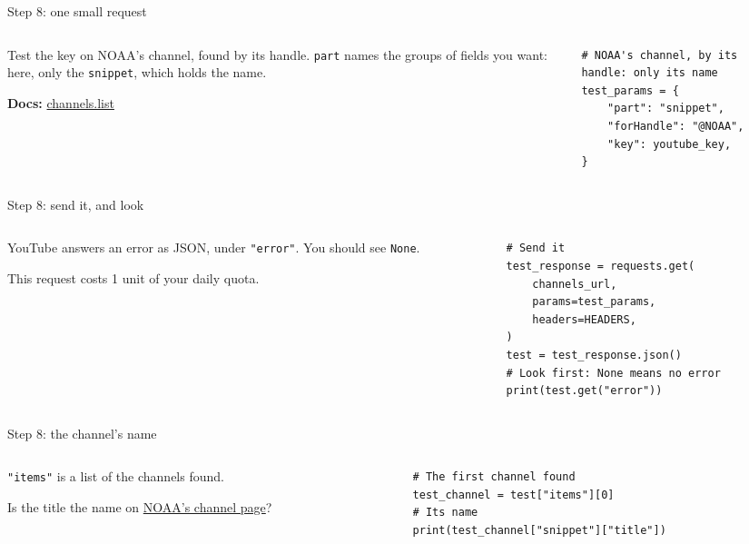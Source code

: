 \documentclass[9pt,aspectratio=169]{beamer}
\begin{document}
\begin{frame}[fragile]{Step 8: one small request}
    \begin{columns}[T]
        \begin{column}{0.37\textwidth}
            Test the key on NOAA's channel, found by its handle. \texttt{part} names the groups of fields you want: here, only the \texttt{snippet}, which holds the name.

            \medskip
            {\scriptsize\textbf{Docs:} \href{https://developers.google.com/youtube/data/reference/rest/v3/channels/list}{channels.list}\par}
        \end{column}
        \begin{column}{0.6\textwidth}
\begin{lstlisting}
# NOAA's channel, by its handle: only its name
test_params = {
    "part": "snippet",
    "forHandle": "@NOAA",
    "key": youtube_key,
}
\end{lstlisting}
        \end{column}
    \end{columns}
\end{frame}

\begin{frame}[fragile]{Step 8: send it, and look}
    \begin{columns}[T]
        \begin{column}{0.37\textwidth}
            YouTube answers an error as JSON, under \texttt{"error"}. You should see \texttt{None}.

            \medskip
            This request costs 1 unit of your daily quota.
        \end{column}
        \begin{column}{0.6\textwidth}
\begin{lstlisting}
# Send it
test_response = requests.get(
    channels_url,
    params=test_params,
    headers=HEADERS,
)
test = test_response.json()
# Look first: None means no error
print(test.get("error"))
\end{lstlisting}
        \end{column}
    \end{columns}
\end{frame}

\begin{frame}[fragile]{Step 8: the channel's name}
    \begin{columns}[T]
        \begin{column}{0.37\textwidth}
            \texttt{"items"} is a list of the channels found.

            \medskip
            Is the title the name on \href{https://www.youtube.com/@NOAA}{NOAA's channel page}?
        \end{column}
        \begin{column}{0.6\textwidth}
\begin{lstlisting}
# The first channel found
test_channel = test["items"][0]
# Its name
print(test_channel["snippet"]["title"])
\end{lstlisting}
        \end{column}
    \end{columns}
\end{frame}
\end{document}
